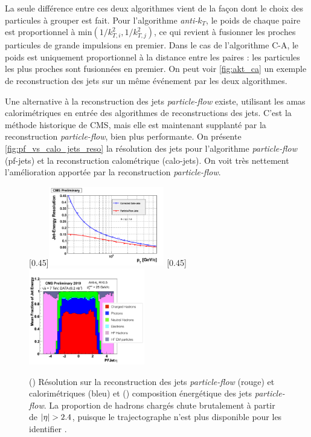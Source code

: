 La seule différence entre ces deux algorithmes vient de la façon dont le choix des particules à grouper est fait. Pour l'algorithme \emph{anti-$k_T$}, le poids de chaque paire est proportionnel à $\text{min}\left( 1 / k^2_{T,i}, 1 / k^2_{T,j} \right)$, ce qui revient à fusionner les proches particules de grande impulsions en premier. Dans le cas de l'algorithme C-A, le poids est uniquement proportionnel à la distance entre les paires : les particules les plus proches sont fusionnées en premier. On peut voir \cref{fig:akt_ca} un exemple de reconstruction des jets sur un même événement par les deux algorithmes.

\bigskip

Une alternative à la reconstruction des jets \emph{particle-flow} existe, utilisant les amas calorimétriques en entrée des algorithmes de reconstructions des jets. C'est la méthode historique de CMS, mais elle est maintenant supplanté par la reconstruction \emph{particle-flow}, bien plus performante. On présente \cref{fig:pf_vs_calo_jets_reso} la résolution des jets pour l'algorithme \emph{particle-flow} (pf-jets) et la reconstruction calométrique (calo-jets). On voit très nettement l'amélioration apportée par la reconstruction \emph{particle-flow}.

\begin{figure}[tbp]
    \centering
    \subcaptionbox{\label{fig:pf_vs_calo_jets_reso}}[0.45\textwidth]{\includegraphics[width=0.45\textwidth]{chapitre3/figs/pf_vs_calo_jets.pdf}} \hfill
    \subcaptionbox{\label{fig:pf_jets_composition}}[0.45\textwidth]{\includegraphics[width=0.45\textwidth]{chapitre3/figs/pf_jets_composition.png}}
    \caption{() Résolution sur la reconstruction des jets \emph{particle-flow} (rouge) et calorimétriques (bleu) et () composition énergétique des jets \emph{particle-flow}. La proportion de hadrons chargés chute brutalement à partir de $\lvert \eta \rvert > 2.4$, puisque le trajectographe n'est plus disponible pour les identifier \citep{cms_pf_jets}.}
    \label{fig:pf_jets_perf}
\end{figure}

